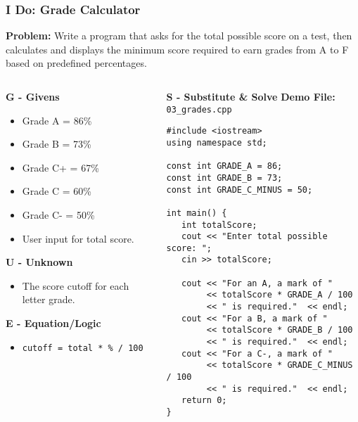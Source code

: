 \documentclass{beamer}
\begin{document}
\begin{frame}[fragile]
\frametitle{I Do: Grade Calculator}
\textbf{Problem:} Write a program that asks for the total possible score on a test, then calculates and displays the minimum score required to earn grades from A to F based on predefined percentages.
\vspace{1em}

\begin{columns}[T]
\begin{column}{0.4\textwidth}
    \textbf{G - Givens}
    \begin{itemize}
        \item Grade A = 86\%
        \item Grade B = 73\%
        \item Grade C+ = 67\%
        \item Grade C = 60\%
        \item Grade C- = 50\%
        \item User input for total score.
    \end{itemize}
    \textbf{U - Unknown}
    \begin{itemize}
        \item The score cutoff for each letter grade.
    \end{itemize}
    \textbf{E - Equation/Logic}
    \begin{itemize}
        \item \small{\texttt{cutoff = total * \% / 100}}
    \end{itemize}
\end{column}
\begin{column}{0.6\textwidth}
    \textbf{S - Substitute \& Solve}
    \newline
    \textbf{Demo File:} \texttt{03\_grades.cpp}
    \begin{verbatim}
#include <iostream>
using namespace std;

const int GRADE_A = 86;
const int GRADE_B = 73;
const int GRADE_C_MINUS = 50;

int main() {
   int totalScore;
   cout << "Enter total possible score: ";
   cin >> totalScore;

   cout << "For an A, a mark of " 
        << totalScore * GRADE_A / 100 
        << " is required."  << endl;
   cout << "For a B, a mark of " 
        << totalScore * GRADE_B / 100 
        << " is required."  << endl;
   cout << "For a C-, a mark of " 
        << totalScore * GRADE_C_MINUS / 100
        << " is required."  << endl;
   return 0;
}
    \end{verbatim}
\end{column}
\end{columns}
\end{frame}
\end{document}
